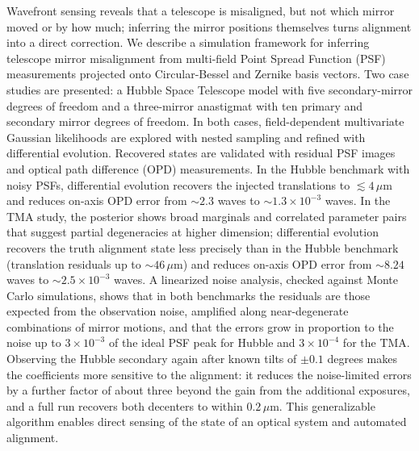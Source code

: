 \documentclass[12pt]{report} %
\begin{document}
Wavefront sensing reveals that a telescope is misaligned, but not which mirror moved or by how much; inferring the mirror positions themselves turns alignment into a direct correction. We describe a simulation framework for inferring telescope mirror misalignment from multi-field Point Spread Function (PSF) measurements projected onto Circular-Bessel and Zernike basis vectors. Two case studies are presented: a Hubble Space Telescope model with five secondary-mirror degrees of freedom and a three-mirror anastigmat with ten primary and secondary mirror degrees of freedom. In both cases, field-dependent multivariate Gaussian likelihoods are explored with nested sampling and refined with differential evolution. Recovered states are validated with residual PSF images and optical path difference (OPD) measurements. In the Hubble benchmark with noisy PSFs, differential evolution recovers the injected translations to $\lesssim 4\,\mu\mathrm{m}$ and reduces on-axis OPD error from $\sim 2.3$ waves to $\sim 1.3\times 10^{-3}$ waves. In the TMA study, the posterior shows broad marginals and correlated parameter pairs that suggest partial degeneracies at higher dimension; differential evolution recovers the truth alignment state less precisely than in the Hubble benchmark (translation residuals up to $\sim 46\,\mu\mathrm{m}$) and reduces on-axis OPD error from $\sim 8.24$ waves to $\sim 2.5\times 10^{-3}$ waves. A linearized noise analysis, checked against Monte Carlo simulations, shows that in both benchmarks the residuals are those expected from the observation noise, amplified along near-degenerate combinations of mirror motions, and that the errors grow in proportion to the noise up to $3\times10^{-3}$ of the ideal PSF peak for Hubble and $3\times10^{-4}$ for the TMA. Observing the Hubble secondary again after known tilts of $\pm0.1$ degrees makes the coefficients more sensitive to the alignment: it reduces the noise-limited errors by a further factor of about three beyond the gain from the additional exposures, and a full run recovers both decenters to within $0.2\,\mu\mathrm{m}$. This generalizable algorithm enables direct sensing of the state of an optical system and automated alignment.










\end{document}
